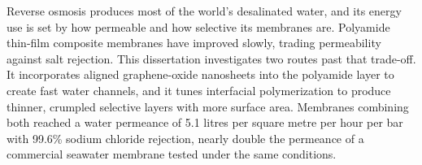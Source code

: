 Reverse osmosis produces most of the world's desalinated water, and its energy use is set by
how permeable and how selective its membranes are. Polyamide thin-film composite membranes have
improved slowly, trading permeability against salt rejection. This dissertation investigates
two routes past that trade-off. It incorporates aligned graphene-oxide nanosheets into the
polyamide layer to create fast water channels, and it tunes interfacial polymerization to
produce thinner, crumpled selective layers with more surface area. Membranes combining both
reached a water permeance of 5.1 litres per square metre per hour per bar with 99.6\% sodium
chloride rejection, nearly double the permeance of a commercial seawater membrane tested under
the same conditions.

